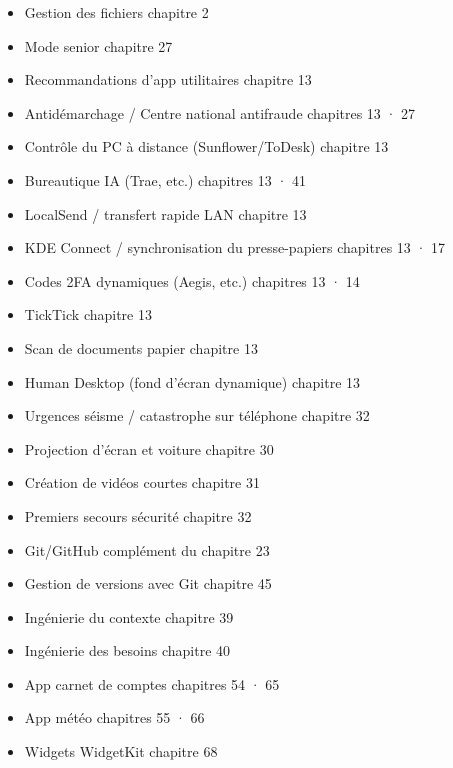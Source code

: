 \begin{itemize}
  \item Gestion des fichiers chapitre 2
  \item Mode senior chapitre 27
  \item Recommandations d'app utilitaires chapitre 13
  \item Antidémarchage / Centre national antifraude chapitres 13 · 27
  \item Contrôle du PC à distance (Sunflower/ToDesk) chapitre 13
  \item Bureautique IA (Trae, etc.) chapitres 13 · 41
  \item LocalSend / transfert rapide LAN chapitre 13
  \item KDE Connect / synchronisation du presse-papiers chapitres 13 · 17
  \item Codes 2FA dynamiques (Aegis, etc.) chapitres 13 · 14
  \item TickTick chapitre 13
  \item Scan de documents papier chapitre 13
  \item Human Desktop (fond d'écran dynamique) chapitre 13
  \item Urgences séisme / catastrophe sur téléphone chapitre 32
  \item Projection d'écran et voiture chapitre 30
  \item Création de vidéos courtes chapitre 31
  \item Premiers secours sécurité chapitre 32
  \item Git/GitHub complément du chapitre 23
  \item Gestion de versions avec Git chapitre 45
  \item Ingénierie du contexte chapitre 39
  \item Ingénierie des besoins chapitre 40
  \item App carnet de comptes chapitres 54 · 65
  \item App météo chapitres 55 · 66
  \item Widgets WidgetKit chapitre 68
\end{itemize}
